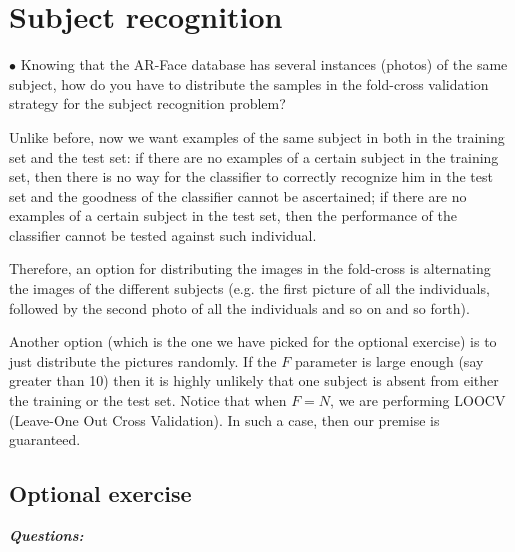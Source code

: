 \section{Subject recognition}

\question

$ \bullet $ Knowing that the AR-Face database has several instances (photos) of the
same subject, how do you have to distribute the samples in the fold-cross
validation strategy for the subject recognition problem?

Unlike before, now we want examples of the same subject in both in the training set and the test set: if there are no examples of a certain subject in the training set, then there is no way for the classifier to correctly recognize him in the test set and the goodness of the classifier cannot be ascertained; if there are no examples of a certain subject in the test set, then the performance of the classifier cannot be tested against such individual.

Therefore, an option for distributing the images in the fold-cross is alternating the images of the different subjects (e.g. the first picture of all the individuals, followed by the second photo of all the individuals and so on and so forth).

Another option (which is the one we have picked for the optional exercise) is to just distribute the pictures randomly. If the $ F $ parameter is large enough (say greater than 10) then it is highly unlikely that one subject is absent from either the training or the test set. Notice that when $ F = N $, we are performing LOOCV (Leave-One Out Cross Validation). In such a case, then our premise is guaranteed.

\subsection{Optional exercise}

{\bfseries \emph{Questions:}}

